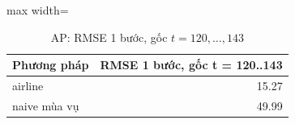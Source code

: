 \begin{table}[H]
\centering\small
\caption{AP: RMSE 1 bước, gốc $t=120,\dots,143$}\label{tab:tab_b12_12_ap_one_step}
\begin{adjustbox}{max width=\linewidth}
\begin{tabular}{lr}
\toprule
Phương pháp & RMSE 1 bước, gốc t = 120..143 \\
\midrule
airline & 15.27 \\
naive mùa vụ & 49.99 \\
\bottomrule
\end{tabular}
\end{adjustbox}
\end{table}
